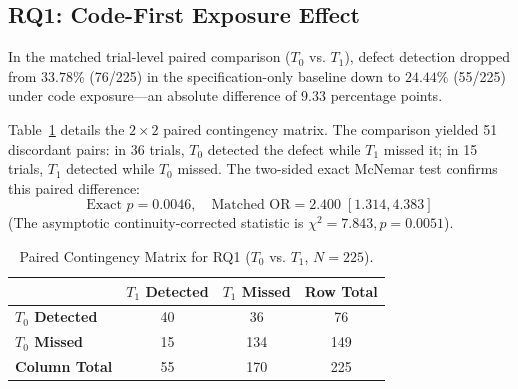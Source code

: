\documentclass[11pt,a4paper]{article}
\begin{document}
\begin{table}[t]
\centering
\caption{Overall $2 \times 2$ Factorial Summary Across All 900 Evaluations ($N=225$ Matched Trials).}
\label{tab:overall_summary}
\end{table}

\subsection{RQ1: Code-First Exposure Effect}
In the matched trial-level paired comparison ($T_0$ vs. $T_1$), defect detection dropped from $33.78\%$ (76/225) in the specification-only baseline down to $24.44\%$ (55/225) under code exposure—an absolute difference of $9.33$ percentage points.

Table~\ref{tab:mcnemar_rq1} details the $2 \times 2$ paired contingency matrix. The comparison yielded 51 discordant pairs: in 36 trials, $T_0$ detected the defect while $T_1$ missed it; in 15 trials, $T_1$ detected while $T_0$ missed. 
The two-sided exact McNemar test confirms this paired difference:
\begin{equation*}
\text{Exact } p = 0.0046, \quad \text{Matched OR} = 2.400 \; [1.314, 4.383]
\end{equation*}
(The asymptotic continuity-corrected statistic is $\chi^2 = 7.843, p = 0.0051$).

\begin{table}[h]
\centering
\caption{Paired Contingency Matrix for RQ1 ($T_0$ vs. $T_1$, $N=225$).}
\label{tab:mcnemar_rq1}
\renewcommand{\arraystretch}{1.15}
\begin{tabular}{lccc}
\toprule
& \textbf{$T_1$ Detected} & \textbf{$T_1$ Missed} & \textbf{Row Total} \\
\midrule
\textbf{$T_0$ Detected} & 40 & 36 & 76 \\
\textbf{$T_0$ Missed}   & 15 & 134 & 149 \\
\midrule
\textbf{Column Total}   & 55 & 170 & 225 \\
\bottomrule
\end{tabular}
\end{table}
\end{document}
